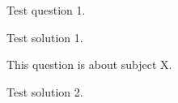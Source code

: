 \documentclass[online]{uob-cs-exam} %
\begin{document}
\maketitle

  \begin{questions}

    \question[10] Test question 1.

    \begin{solution}
      Test solution 1.
    \end{solution}

    \question[10]
      This question is about subject X.

    \begin{solution}
      Test solution 2.
    \end{solution}

  \end{questions}
\end{document}
